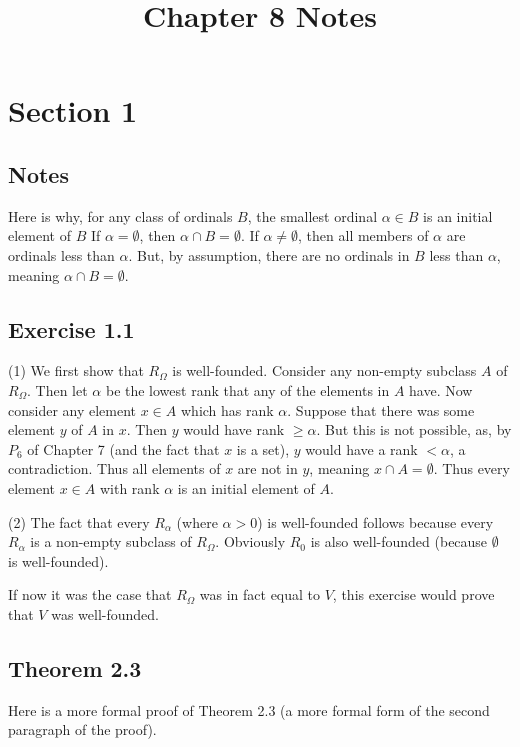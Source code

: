 \documentclass{article}
\title{Chapter 8 Notes}
\theoremstyle{definition}
\begin{document}
\date{}
\maketitle

\section*{Section 1}

\subsection*{Notes}
Here is why, for any class of ordinals $B$, the smallest ordinal $\alpha\in B$ is an initial element of $B$ 
If $\alpha=\emptyset$, then $\alpha\cap B=\emptyset$. 
If $\alpha\ne\emptyset$, then all members of $\alpha$ are ordinals less than $\alpha$. But, by assumption, there are no ordinals in $B$ less than 
$\alpha$, meaning $\alpha\cap B=\emptyset$.

\subsection*{Exercise 1.1}
(1) We first show that $R_\Omega$ is well-founded. Consider any non-empty subclass $A$ of $R_\Omega$. Then let $\alpha$ be the 
lowest rank that any of the elements in $A$ have. Now consider any element $x\in A$ which has rank $\alpha$. 
Suppose that there was some element $y$ of $A$ in $x$. Then $y$ would have rank $\ge\alpha$. But this is not possible, as, by 
$P_6$ of Chapter 7 (and the fact that $x$ is a set), $y$ would have a rank $<\alpha$, a contradiction. Thus 
all elements of $x$ are not in $y$, meaning $x\cap A=\emptyset$. Thus every element $x\in A$ with rank $\alpha$ is an 
initial element of $A$.

(2) The fact that every $R_\alpha$ (where $\alpha>0$) is well-founded follows because every $R_\alpha$ is a non-empty subclass of 
$R_\Omega$. Obviously $R_0$ is also well-founded (because $\emptyset$ is well-founded). 

If now it was the case that $R_\Omega$ was in fact equal to $V$, this exercise would prove that 
$V$ was well-founded.

\subsection*{Theorem 2.3}
Here is a more formal proof of Theorem 2.3 (a more formal form of the second paragraph of the proof).
\end{document}
